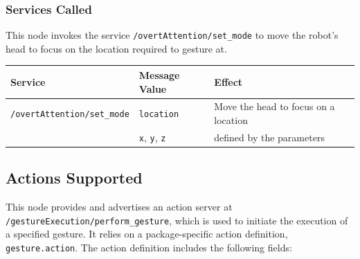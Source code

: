 \documentclass{CSSRforAfrica}
\begin{document}
{{%




\subsubsection*{Services Called}
This node  invokes the service {\small \verb+/overtAttention/set_mode+} to move the robot's head to focus on the location required to gesture at. 

\begin{center}
	\begin{tabularx}{\linewidth}{| l | l | X|}
		\hline 
		{\small Service }                                                                                & {\small Message Value}    &  {\small Effect}       \\
		\hline
		{\footnotesize \verb+/overtAttention/set_mode+ }  & {\footnotesize \verb+location+} & {\small Move the head to focus on a location } \\ 
		& {\footnotesize  \verb+x+, \verb+y+, \verb+z+ } &    defined by the parameters \\ 
		\hline
	\end{tabularx}
\end{center}



\subsection*{Actions Supported}
This node provides and advertises an action server at \texttt{/gestureExecution/perform\_gesture}, which is used to initiate the execution of a specified gesture. It relies on a package-specific action definition, \texttt{gesture.action}. The action definition includes the following fields:

}}
\end{document}
